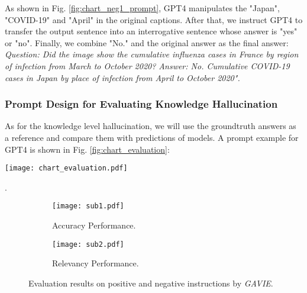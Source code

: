 As shown in Fig. \ref{fig:chart_neg1_prompt}, GPT4 manipulates the "Japan", "COVID-19" and "April" in the original captions. After that, we instruct GPT4 to transfer the output sentence into an interrogative sentence whose answer is "yes" or "no". Finally, we combine "No." and the original answer as the final answer: \textit{Question: Did the image show the cumulative influenza cases in France by region of infection from March to October 2020? Answer: No. Cumulative COVID-19 cases in Japan by place of infection from April to October 2020".}


\subsubsection{Prompt Design for Evaluating Knowledge Hallucination}
As for the knowledge level hallucination, we will use the groundtruth answers as a reference and compare them with predictions of models. A prompt example for GPT4 is shown in Fig. \ref{fig:chart_evaluation}:

\begin{figure*}[h]
    \centering
      \texttt{[image: chart\_evaluation.pdf]}
    \caption{An example prompt for text-only GPT4 we use to evaluate knowledge manipulation instruction. The sentences in \textcolor{blue}{BLUE} are the questions, reference answers, and predictions of models.}
    \label{fig:chart_evaluation}
    \vspace{-0.2in}
\end{figure*}


.



\begin{figure}[t]
     \centering
     \begin{subfigure}[b]{0.49\textwidth}
         \centering
         \texttt{[image: sub1.pdf]}
         \vspace{-0.2in}
         \caption{Accuracy Performance.}
         \label{fig:y equals x}
     \end{subfigure}
     \hfill
     \begin{subfigure}[b]{0.49\textwidth}
         \centering
         \texttt{[image: sub2.pdf]}
         \vspace{-0.2in}
         \caption{Relevancy Performance.}
         \label{fig:three sin x}
     \end{subfigure}
        \caption{Evaluation results on positive and negative instructions by \textit{GAVIE}. }
        \label{fig:posneg}
\vspace{-0.1in}
\end{figure}

